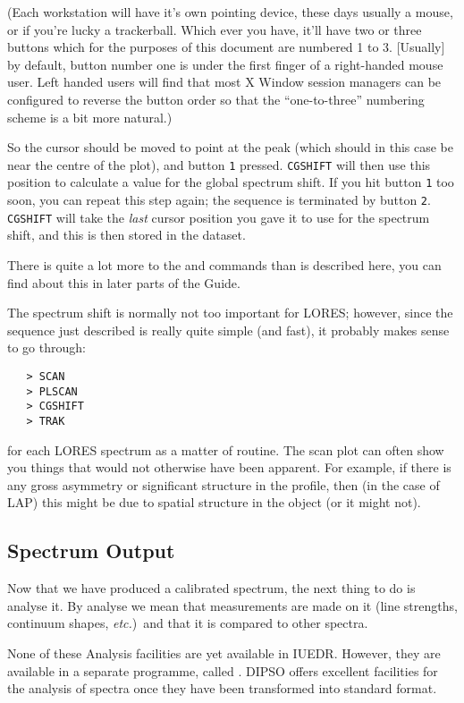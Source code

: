 (Each workstation will have it's own pointing device, these days usually a
mouse, or if you're lucky a trackerball.  Which ever you have, it'll have two
or three buttons which for the purposes of this document are numbered 1 to 3.
[Usually] by default, button number one is under the first finger of a
right-handed mouse user.  Left handed users will find that most X Window
session managers can be configured to reverse the button order so that the
``one-to-three'' numbering scheme is a bit more natural.)

So the cursor should be moved to point at the peak (which should in this case
be near the centre of the plot), and button \verb+1+ pressed.  \verb+CGSHIFT+
will then use this position to calculate a value for the global spectrum shift.
If you hit button \verb+1+ too soon, you can repeat this step again; the
sequence is terminated by button \verb+2+\@. \verb+CGSHIFT+ will take the {\em
last} cursor position you gave it to use for the spectrum shift, and this is
then stored in the dataset.

There is quite a lot more to the 
 and 
 commands than
is described here, you can find about this in later parts of the Guide.

The spectrum shift is normally not too important for LORES; however,
since the sequence just described is really quite simple (and fast), it
probably makes sense to go through:

\begin{verbatim}
   > SCAN
   > PLSCAN
   > CGSHIFT
   > TRAK
\end{verbatim}

for each LORES spectrum as a matter of routine.  The scan plot can often
show you things that would not otherwise have been apparent.  For example, if
there is any gross asymmetry or significant structure in the profile, then (in
the case of LAP) this might be due to spatial structure in the object (or it
might not)\@.


\subsection{Spectrum Output}

Now that we have produced a calibrated spectrum, the next thing to do is
analyse it.  By analyse we mean that measurements are made on it (line
strengths, continuum shapes, {\it etc.})\ and that it is compared to other
spectra.

None of these Analysis facilities are yet available in IUEDR\@.  However,
they are available in a separate programme, called \@.
DIPSO offers excellent facilities for the analysis of spectra once they
have been transformed into standard format.

